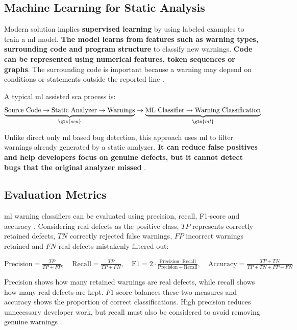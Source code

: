 
\subsection{Machine Learning for Static Analysis}

\hspace{0.6em} Modern solution implies \textbf{supervised learning} by using labeled examples to train a \gls{ml} model. \textbf{The model learns from features such as warning types, surrounding code and program structure} to classify new warnings. \textbf{Code can be represented using numerical features, token sequences or graphs}. The surrounding code is important because a warning may depend on conditions or statements outside the reported line \cite{paper1_kharkarlearning2022,paper2_hegedHus2022static,paper3_yerramreddy2023empirical}.

\hspace{0.6em} A typical \gls{ml} assisted \gls{sca} process is:
\[
\underbrace{\text{Source Code}
\rightarrow \text{Static Analyzer}
\rightarrow \text{Warnings}}_{\gls{sca}}
\rightarrow
\underbrace{\text{ML Classifier}
\rightarrow \text{Warning Classification}}_{\gls{ml}}
\]

\hspace{0.6em} Unlike direct only \gls{ml} based bug detection, this approach uses \gls{ml} to filter warnings already generated by a static analyzer. \textbf{It can reduce false positives and help developers focus on genuine defects, but it cannot detect bugs that the original analyzer missed} \cite{paper1_kharkarlearning2022}.


\subsection{Evaluation Metrics}

\hspace{0.6em} \gls{ml} warning classifiers can be evaluated using precision, recall, F1-score and accuracy \cite{paper2_hegedHus2022static,paper3_yerramreddy2023empirical}. Considering real defects as the positive class, $TP$ represents correctly retained defects, $TN$ correctly rejected false warnings, $FP$ incorrect warnings retained and $FN$ real defects mistakenly filtered out: \newline

$\mathrm{Precision} = \frac{TP}{TP+FP},\quad \mathrm{Recall} = \frac{TP}{TP+FN},\quad \mathrm{F1} = 2\cdot\frac{\mathrm{Precision}\cdot\mathrm{Recall}}{\mathrm{Precision}+\mathrm{Recall}},\quad \mathrm{Accuracy} = \frac{TP+TN}{TP+TN+FP+FN}$ \newline

\hspace{0.6em} Precision shows how many retained warnings are real defects, while recall shows how many real defects are kept. $F1$ score balances these two measures and accuracy shows the proportion of correct classifications. High precision reduces unnecessary developer work, but recall must also be considered to avoid removing genuine warnings \cite{paper1_kharkarlearning2022,paper3_yerramreddy2023empirical}.



